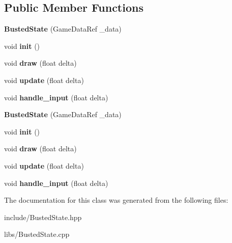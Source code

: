 \subsection*{Public Member Functions}
\begin{DoxyCompactItemize}
\item 
\mbox{\label{classcp_1_1_busted_state_a10df824b1aa48bab895bbe58eecdf5c5}} 
{\bfseries Busted\+State} (Game\+Data\+Ref \+\_\+data)
\item 
\mbox{\label{classcp_1_1_busted_state_a9ac923c5b03d68e3d2f81c1f9a8b5e0b}} 
void {\bfseries init} ()
\item 
\mbox{\label{classcp_1_1_busted_state_a5ba8cb5f8e7991be6b6975a7c1086ac7}} 
void {\bfseries draw} (float delta)
\item 
\mbox{\label{classcp_1_1_busted_state_a4e6cae36e30f6e29c85550a75fba9b98}} 
void {\bfseries update} (float delta)
\item 
\mbox{\label{classcp_1_1_busted_state_a6a834c039be196d923b575fbe270f09c}} 
void {\bfseries handle\+\_\+input} (float delta)
\item 
\mbox{\label{classcp_1_1_busted_state_a10df824b1aa48bab895bbe58eecdf5c5}} 
{\bfseries Busted\+State} (Game\+Data\+Ref \+\_\+data)
\item 
\mbox{\label{classcp_1_1_busted_state_a9ac923c5b03d68e3d2f81c1f9a8b5e0b}} 
void {\bfseries init} ()
\item 
\mbox{\label{classcp_1_1_busted_state_a5ba8cb5f8e7991be6b6975a7c1086ac7}} 
void {\bfseries draw} (float delta)
\item 
\mbox{\label{classcp_1_1_busted_state_a4e6cae36e30f6e29c85550a75fba9b98}} 
void {\bfseries update} (float delta)
\item 
\mbox{\label{classcp_1_1_busted_state_a6a834c039be196d923b575fbe270f09c}} 
void {\bfseries handle\+\_\+input} (float delta)
\end{DoxyCompactItemize}


The documentation for this class was generated from the following files\+:\begin{DoxyCompactItemize}
\item 
include/Busted\+State.\+hpp\item 
libs/Busted\+State.\+cpp\end{DoxyCompactItemize}
